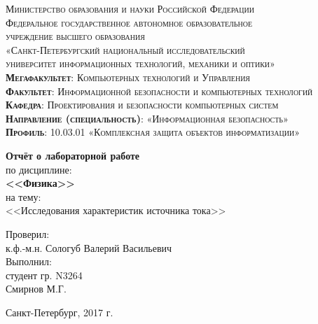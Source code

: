 \begin{titlepage}
	\begin{center}
		\textsc{
			\fontsize{12pt}{14pt}\selectfont
			Министерство образования и науки Российской Федерации\\
			Федеральное государственное автономное образовательное\\
			учреждение высшего образования\\
			«Санкт-Петербургский национальный исследовательский\\
			университет информационных технологий, механики и оптики»\\
			\textbf{Мегафакультет}:  Компьютерных технологий и Управления\\
			\textbf{Факультет}: Информационной безопасности и компьютерных технологий\\
			\textbf{Кафедра}: Проектирования и безопасности компьютерных систем\\
			\textbf{Направление (специальность)}: «Информационная безопасность»\\
			\textbf{Профиль}: 10.03.01 «Комплексная защита объектов информатизации»}

		\vfill

		\textbf{Отчёт о лабораторной работе}\\
		по дисциплине:\\
		\textbf{<<Физика>>}\\
		на тему:\\
		<<Исследования характеристик источника тока>>\\
	\end{center}

	\hfill
	\begin{flushright}
		Проверил:\\[2mm] 
		к.ф.-м.н. Сологуб Валерий Васильевич\\[2mm] 

		Выполнил:\\
		студент гр.  N3264\\
		Смирнов М.Г.\\[2mm]

	\end{flushright}%
	\vfill
	\begin{center}
		Санкт-Петербург, 2017 г.
	\end{center}
\end{titlepage}


